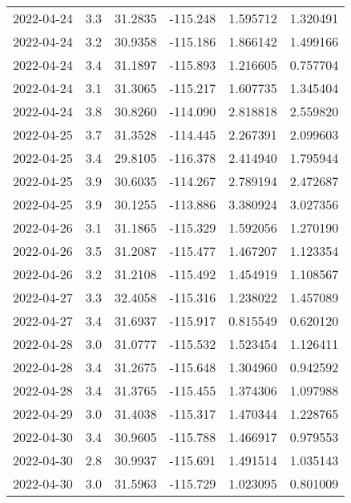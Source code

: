 \begin{tabular}{lrrrrr}
2022-04-24 &       3.3 &  31.2835 &  -115.248 &         1.595712 &         1.320491 \\
2022-04-24 &       3.2 &  30.9358 &  -115.186 &         1.866142 &         1.499166 \\
2022-04-24 &       3.4 &  31.1897 &  -115.893 &         1.216605 &         0.757704 \\
2022-04-24 &       3.1 &  31.3065 &  -115.217 &         1.607735 &         1.345404 \\
2022-04-24 &       3.8 &  30.8260 &  -114.090 &         2.818818 &         2.559820 \\
2022-04-25 &       3.7 &  31.3528 &  -114.445 &         2.267391 &         2.099603 \\
2022-04-25 &       3.4 &  29.8105 &  -116.378 &         2.414940 &         1.795944 \\
2022-04-25 &       3.9 &  30.6035 &  -114.267 &         2.789194 &         2.472687 \\
2022-04-25 &       3.9 &  30.1255 &  -113.886 &         3.380924 &         3.027356 \\
2022-04-26 &       3.1 &  31.1865 &  -115.329 &         1.592056 &         1.270190 \\
2022-04-26 &       3.5 &  31.2087 &  -115.477 &         1.467207 &         1.123354 \\
2022-04-26 &       3.2 &  31.2108 &  -115.492 &         1.454919 &         1.108567 \\
2022-04-27 &       3.3 &  32.4058 &  -115.316 &         1.238022 &         1.457089 \\
2022-04-27 &       3.4 &  31.6937 &  -115.917 &         0.815549 &         0.620120 \\
2022-04-28 &       3.0 &  31.0777 &  -115.532 &         1.523454 &         1.126411 \\
2022-04-28 &       3.4 &  31.2675 &  -115.648 &         1.304960 &         0.942592 \\
2022-04-28 &       3.4 &  31.3765 &  -115.455 &         1.374306 &         1.097988 \\
2022-04-29 &       3.0 &  31.4038 &  -115.317 &         1.470344 &         1.228765 \\
2022-04-30 &       3.4 &  30.9605 &  -115.788 &         1.466917 &         0.979553 \\
2022-04-30 &       2.8 &  30.9937 &  -115.691 &         1.491514 &         1.035143 \\
2022-04-30 &       3.0 &  31.5963 &  -115.729 &         1.023095 &         0.801009 \\

\end{tabular}
